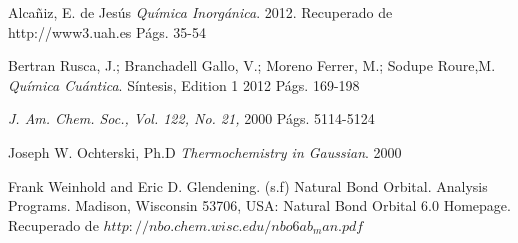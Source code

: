 \begin{thebibliography}{9}
Alcañiz, E. de Jesús  
\textit{Química Inorgánica}. 
2012. 
Recuperado de http://www3.uah.es Págs. 35-54

Bertran Rusca, J.; Branchadell Gallo, V.; Moreno Ferrer, M.; Sodupe Roure,M.  
\textit{Química Cuántica}. Síntesis, Edition 1
2012 Págs. 169-198

\textit{J. Am. Chem. Soc., Vol. 122, No. 21, }
2000 Págs. 5114-5124

Joseph W. Ochterski, Ph.D
\textit{Thermochemistry in Gaussian}.
2000

Frank Weinhold and Eric D. Glendening. (s.f) Natural Bond Orbital. Analysis Programs. Madison, Wisconsin 53706, USA: Natural Bond Orbital 6.0 Homepage. Recuperado de $http://nbo.chem.wisc.edu/nbo6ab_man.pdf$
\end{thebibliography}